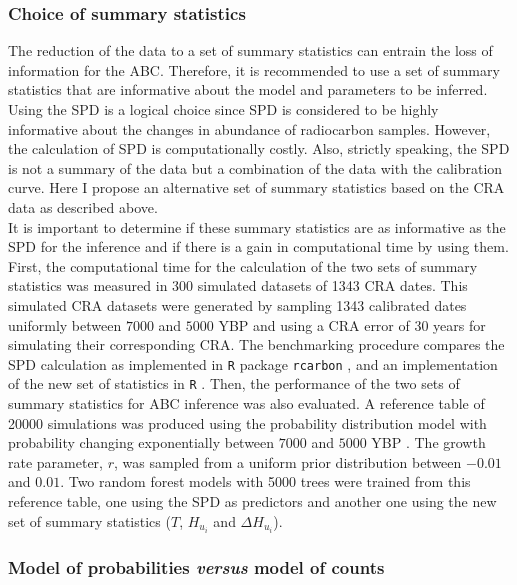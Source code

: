 \documentclass[a4paper]{article}
\begin{document}
\subsubsection*{Choice of summary statistics}

The reduction of the data to a set of summary statistics can entrain the loss of information for the ABC. Therefore, it is recommended to use a set of summary statistics that are informative about the model and parameters to be inferred. Using the SPD \parencite[as in][]{Porcic2020,DiNapoli2021} is a logical choice since SPD is considered to be highly informative about the changes in abundance of radiocarbon samples. However, the calculation of SPD is computationally costly. Also, strictly speaking, the SPD is not a summary of the data but a combination of the data with the calibration curve. Here I propose an alternative set of summary statistics based on the CRA data as described above.
\\

It is important to determine if these summary statistics are as informative as the SPD for the inference and if there is a gain in computational time by using them. First, the computational time for the calculation of the two sets of summary statistics was measured in 300 simulated datasets of 1343 CRA dates. This simulated CRA datasets were generated by sampling 1343 calibrated dates uniformly between $7000$ and $5000$ YBP and using a CRA error of 30 years for simulating their corresponding CRA. The benchmarking procedure compares the SPD calculation as implemented in \texttt{R} package \texttt{rcarbon} \parencite{Crema2021a}, and an implementation of the new set of statistics in \texttt{R} \parencite{Navascues2023}. Then, the performance of the two sets of summary statistics for ABC inference was also evaluated. A reference table of 20000 simulations was produced using the probability distribution model with  probability changing exponentially between $7000$ and $5000$ YBP \parencite[\emph{i.e.}\ the same model used in the ABC example in][]{Crema2022}. The growth rate parameter, $r$, was sampled from a uniform prior distribution between $-0.01$ and $0.01$. Two random forest models with 5000 trees were trained from this reference table, one using the SPD as predictors and another one using the new set of summary statistics ($T$, $H_{u_i}$ and $\Delta H_{u_i}$).
\\

\subsubsection*{Model of probabilities \emph{versus} model of counts}
\end{document}
